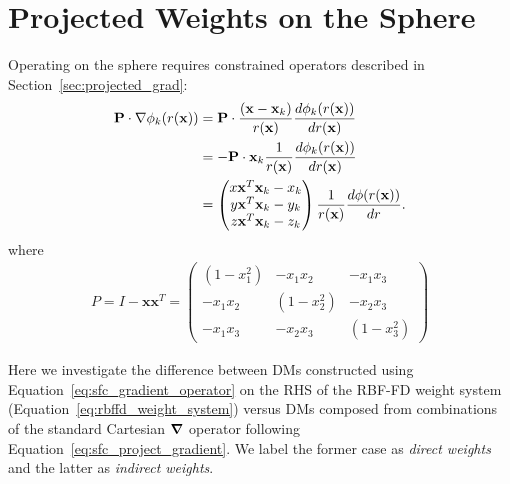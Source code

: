 %
% 
%
%


\chapter{Projected Weights on the Sphere} 
\label{app:indirect_weights}

Operating on the sphere requires constrained operators described in Section~\ref{sec:projected_grad}:
\begin{align}
\mathbf{P} \cdot \nabla \phi_{k}(r(\vx)) & = \mathbf{P} \cdot \frac{(\vx-\vx_{k})}{r(\vx)} \d{\phi_{k}(r(\vx))}{r(\vx)}  \nonumber \\
& = -\mathbf{P} \cdot \vx_{k}\frac{1}{r(\vx)} \d{\phi_{k}(r(\vx))}{r(\vx)}  \nonumber \\ %
& = \begin{pmatrix} x \vx^{T} \vx_{k} - x_{k} \\  y \vx^{T} \vx_{k} - y_{k} \\  z \vx^{T} \vx_{k} - z_{k} \end{pmatrix} \frac{1}{r(\vx)} \d{\phi(r(\vx))}{r} \label{eq:sfc_gradient_operator}.
\end{align}
where 
\begin{align}
P = I - \mathbf{x} \mathbf{x}^T =  \begin{pmatrix} 
(1-x_1^2) & -x_1 x_2 & -x_1 x_3 \\
-x_1 x_2 & (1-x_2^2) & -x_2 x_3 \\ 
-x_1 x_3 & -x_2 x_3 & (1-x_3^2) 
\end{pmatrix} 
\label{eq:sfc_project_gradient}
\end{align}

Here we investigate the difference between DMs constructed using Equation~\ref{eq:sfc_gradient_operator} on the RHS of the RBF-FD weight system (Equation~\ref{eq:rbffd_weight_system}) versus DMs composed from combinations of the standard Cartesian $\grad$ operator following Equation~\ref{eq:sfc_project_gradient}. We label the former case as \emph{direct weights} and the latter as \emph{indirect weights}. 


